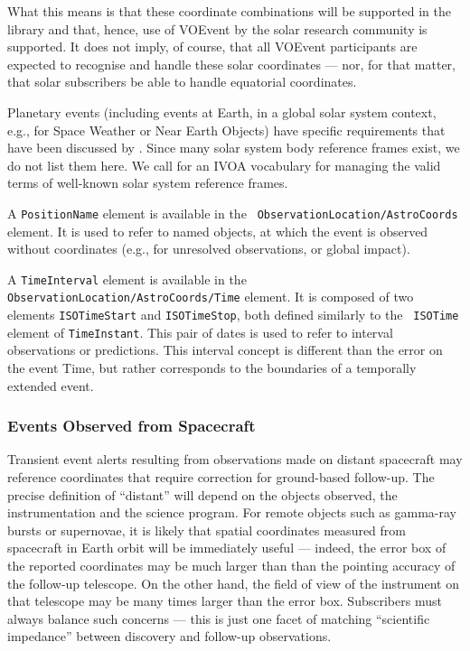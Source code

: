 \documentclass[11pt,a4paper]{ivoa}
\begin{document}
What this means is that these coordinate combinations will be supported in the 
library and that, hence, use of VOEvent by the solar research community is 
supported. It does not imply, of course, that all VOEvent participants are 
expected to recognise and handle these solar coordinates --- nor, for that 
matter, that solar subscribers be able to handle equatorial coordinates. 

Planetary events (including events at Earth, in a global solar system context,
e.g., for Space Weather or Near Earth Objects) have specific requirements that 
have been discussed by \citet{2018arXiv181112680C}. Since many solar system body 
reference frames exist, we do not list them here. We call for an IVOA vocabulary 
for managing the valid terms of well-known solar system reference frames.

A {\tt PositionName} element is available in the {\tt 
ObservationLocation/AstroCoords} element. It is used to refer to named objects, 
at which the event is observed without coordinates (e.g., for unresolved 
observations, or global impact).  

A {\tt TimeInterval} element is available in the {\tt 
ObservationLocation/AstroCoords/Time} element. It is composed of two elements 
{\tt ISOTimeStart} and {\tt ISOTimeStop}, both defined similarly to the {\tt 
ISOTime} element of {\tt TimeInstant}. This pair of dates is used to refer to 
interval observations or predictions. This interval concept is different than 
the error on the event Time, but rather corresponds to the boundaries of a 
temporally extended event. 


\subsubsection{Events Observed from Spacecraft}
\label{sec:3.4.5}
Transient event alerts resulting from observations made on distant spacecraft 
may reference coordinates that require correction for ground-based follow-up. 
The precise definition of ``distant'' will depend on the objects observed, the 
instrumentation and the science program. For remote objects such as gamma-ray 
bursts or supernovae, it is likely that spatial coordinates measured from 
spacecraft in Earth orbit will be immediately useful --- indeed, the error box 
of the reported coordinates may be much larger than than the pointing accuracy 
of the follow-up telescope. On the other hand, the field of view of the 
instrument on that telescope may be many times larger than the error box. 
Subscribers must always balance such concerns --- this is just one facet of 
matching ``scientific impedance'' between discovery and follow-up observations. 
\end{document}
